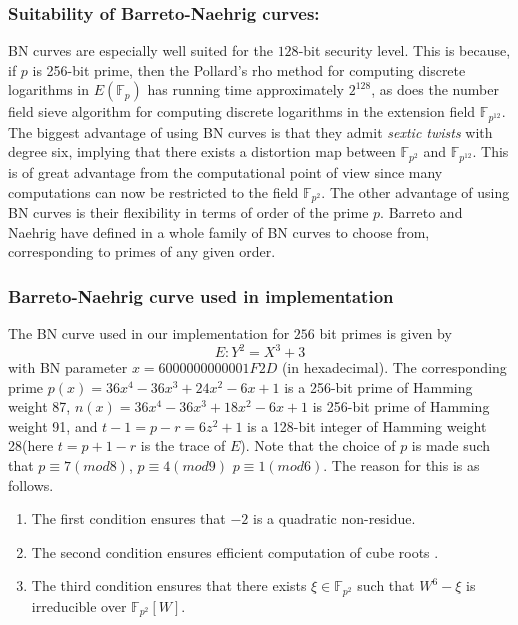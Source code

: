 \subsubsection{Suitability of Barreto-Naehrig curves:}
BN curves are especially well suited for the $128$-bit security level. This is because, if $p$ is 256-bit prime, then the Pollard’s rho method for computing discrete logarithms in $E(\mathbb{F}_p)$ has running time approximately $2^{128}$, as does the number field sieve algorithm for computing discrete logarithms in the extension field $\mathbb{F}_{p^{12}}$. The biggest advantage of using BN curves is that they admit \emph{sextic twists} with degree six, implying that there exists a distortion map between $\mathbb{F}_{p^2}$ and $\mathbb{F}_{p^12}$. This is of great advantage from the computational point of view since many computations can now be restricted to the field $\mathbb{F}_{p^2}$. The other advantage of using BN curves is their flexibility in terms of order of the prime $p$.  Barreto and Naehrig have defined in \cite{barreto2006pairing} a whole family of BN curves to choose from, corresponding to primes of any given order.  
\subsubsection{Barreto-Naehrig curve used in implementation}
The BN curve used in our implementation for $256$ bit primes is given by 
\begin{equation}
E : Y^2 = X^3 + 3
\end{equation}
with BN parameter $x = 6000000000001F2D$ (in hexadecimal). The corresponding prime $p(x) = 36x^4-36x^3+24x^2-6x+1$ is a 256-bit prime of Hamming weight 87, $n(x) = 36x^4-36x^3+18x^2-6x+1$ is 256-bit prime of Hamming weight 91, and $t-1 = p-r = 6z^2+1$ is a 128-bit integer of Hamming weight 28(here $t = p+1-r$ is the trace of $E$). Note that the choice of $p$ is made such that $p\equiv{7(mod8)}$, $p\equiv{4(mod9)}$ $p\equiv{1(mod6)}$. The reason for this is as follows.

\begin{enumerate}
 \item The first condition ensures that $-2$ is a quadratic non-residue.
 \item The second condition ensures efficient computation of cube roots \cite{cryptoeprint:2005:133}.
 \item The third condition ensures that there exists $\xi \in \mathbb{F}_{p^2}$ such that $W^6 - \xi$ is irreducible over $\mathbb{F}_{p^2}[W]$.  
 
\end{enumerate}


